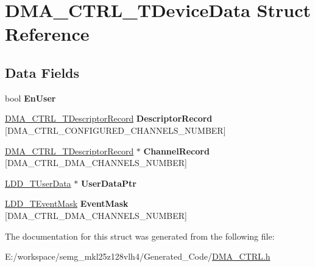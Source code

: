 \hypertarget{struct_d_m_a___c_t_r_l___t_device_data}{\section{D\-M\-A\-\_\-\-C\-T\-R\-L\-\_\-\-T\-Device\-Data Struct Reference}
\label{struct_d_m_a___c_t_r_l___t_device_data}
}
\subsection*{Data Fields}
\begin{DoxyCompactItemize}
\item 
\hypertarget{struct_d_m_a___c_t_r_l___t_device_data_a348ba06e676d180d66e9debbfcc69fd0}{bool {\bfseries En\-User}}\label{struct_d_m_a___c_t_r_l___t_device_data_a348ba06e676d180d66e9debbfcc69fd0}

\item 
\hypertarget{struct_d_m_a___c_t_r_l___t_device_data_a00786c7b8f060862d78c3ea16e65f758}{\hyperlink{struct_d_m_a___c_t_r_l___t_descriptor_record}{D\-M\-A\-\_\-\-C\-T\-R\-L\-\_\-\-T\-Descriptor\-Record} {\bfseries Descriptor\-Record} \mbox{[}D\-M\-A\-\_\-\-C\-T\-R\-L\-\_\-\-C\-O\-N\-F\-I\-G\-U\-R\-E\-D\-\_\-\-C\-H\-A\-N\-N\-E\-L\-S\-\_\-\-N\-U\-M\-B\-E\-R\mbox{]}}\label{struct_d_m_a___c_t_r_l___t_device_data_a00786c7b8f060862d78c3ea16e65f758}

\item 
\hypertarget{struct_d_m_a___c_t_r_l___t_device_data_a57a5d6f02c88b680beb079565f8c256c}{\hyperlink{struct_d_m_a___c_t_r_l___t_descriptor_record}{D\-M\-A\-\_\-\-C\-T\-R\-L\-\_\-\-T\-Descriptor\-Record} $\ast$ {\bfseries Channel\-Record} \mbox{[}D\-M\-A\-\_\-\-C\-T\-R\-L\-\_\-\-D\-M\-A\-\_\-\-C\-H\-A\-N\-N\-E\-L\-S\-\_\-\-N\-U\-M\-B\-E\-R\mbox{]}}\label{struct_d_m_a___c_t_r_l___t_device_data_a57a5d6f02c88b680beb079565f8c256c}

\item 
\hypertarget{struct_d_m_a___c_t_r_l___t_device_data_a17d24b41be32e77ca68bbbf2ea83f4c0}{\hyperlink{group___p_e___types__module_ga0b66a73f87238a782318aa0be7578e35}{L\-D\-D\-\_\-\-T\-User\-Data} $\ast$ {\bfseries User\-Data\-Ptr}}\label{struct_d_m_a___c_t_r_l___t_device_data_a17d24b41be32e77ca68bbbf2ea83f4c0}

\item 
\hypertarget{struct_d_m_a___c_t_r_l___t_device_data_ac3beac47de71741f03be2386eda0b9d6}{\hyperlink{group___p_e___types__module_gafbe7f4d4e51560399c3bdd0218584533}{L\-D\-D\-\_\-\-T\-Event\-Mask} {\bfseries Event\-Mask} \mbox{[}D\-M\-A\-\_\-\-C\-T\-R\-L\-\_\-\-D\-M\-A\-\_\-\-C\-H\-A\-N\-N\-E\-L\-S\-\_\-\-N\-U\-M\-B\-E\-R\mbox{]}}\label{struct_d_m_a___c_t_r_l___t_device_data_ac3beac47de71741f03be2386eda0b9d6}

\end{DoxyCompactItemize}


The documentation for this struct was generated from the following file\-:\begin{DoxyCompactItemize}
\item 
E\-:/workspace/semg\-\_\-mkl25z128vlh4/\-Generated\-\_\-\-Code/\hyperlink{_d_m_a___c_t_r_l_8h}{D\-M\-A\-\_\-\-C\-T\-R\-L.\-h}\end{DoxyCompactItemize}
